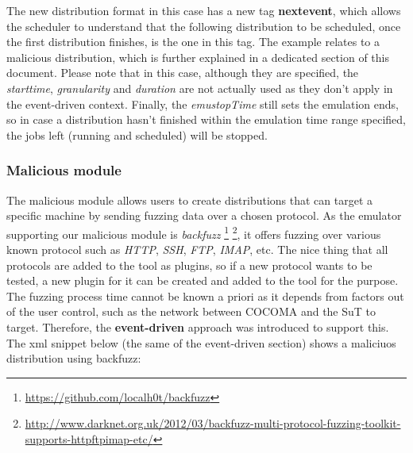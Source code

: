 \documentclass[letterpaper,10pt,english]{sphinxhowto}
\begin{document}
The new distribution format in this case has a new tag \textbf{nextevent}, which allows the scheduler to understand that the following distribution to be scheduled, once the first distribution finishes, is the one in this tag. The example relates to a malicious distribution, which is further explained in a dedicated section of this document. Please note that in this case, although they are specified, the \emph{starttime}, \emph{granularity} and \emph{duration} are not actually used as they don't apply in the event-driven context. Finally, the \emph{emustopTime} still sets the emulation ends, so in case a distribution hasn't finished within the emulation time range specified, the jobs left (running and scheduled) will be stopped.


\subsubsection{Malicious module}
\label{COCOMA/06_additional_features:malicious-module}
The malicious module allows users to create distributions that can target a specific machine by sending fuzzing data over a chosen protocol. As the emulator supporting our malicious module is \emph{backfuzz} \footnote{
\href{https://github.com/localh0t/backfuzz}{https://github.com/localh0t/backfuzz}
} \footnote{
\href{http://www.darknet.org.uk/2012/03/backfuzz-multi-protocol-fuzzing-toolkit-supports-httpftpimap-etc/}{http://www.darknet.org.uk/2012/03/backfuzz-multi-protocol-fuzzing-toolkit-supports-httpftpimap-etc/}
}, it offers fuzzing over various known protocol such as \emph{HTTP}, \emph{SSH}, \emph{FTP}, \emph{IMAP}, etc. The nice thing that all protocols are added to the tool as plugins, so if a new protocol wants to be tested, a new plugin for it can be created and added to the tool for the purpose.
The fuzzing process time cannot be known a priori as it depends from factors out of the user control, such as the network between COCOMA and the SuT to target. Therefore, the \textbf{event-driven} approach was introduced to support this. The xml snippet below (the same of the event-driven section) shows a maliciuos distribution using backfuzz:
\end{document}
